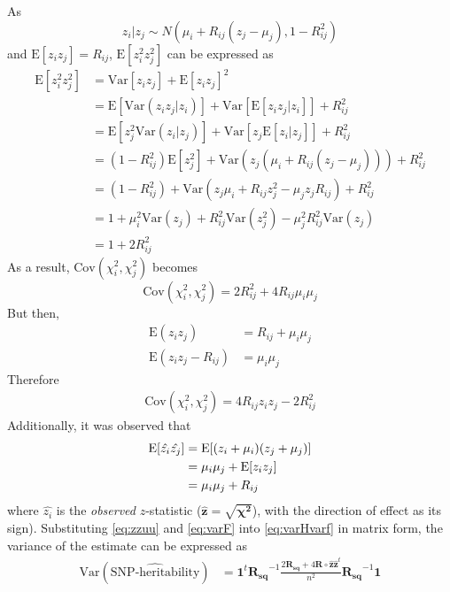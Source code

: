 \documentclass[12pt]{scrbook}
\begin{document}
As 
$$
z_i|z_j\sim N(\mu_i+R_{ij}(z_j-\mu_j),1-R_{ij}^2)
$$
and $\mathrm{E}[z_iz_j]=R_{ij}$, $\mathrm{E}[z_i^2z_j^2]$ can be expressed as
\begin{align*}
\mathrm{E}[z_i^2z_j^2]&=\mathrm{Var}[z_iz_j]+\mathrm{E}[z_iz_j]^2\\
&=\mathrm{E}[\mathrm{Var}(z_iz_j|z_i)]+\mathrm{Var}[\mathrm{E}[z_iz_j|z_i]]+R_{ij}^2\\
&=\mathrm{E}[z_j^2\mathrm{Var}(z_i|z_j)]+\mathrm{Var}[z_j\mathrm{E}[z_i|z_j]]+R_{ij}^2\\
&=(1-R_{ij}^2)\mathrm{E}[z_j^2]+\mathrm{Var}(z_j(\mu_i+R_{ij}(z_j-\mu_j)))+R_{ij}^2\\
&=(1-R_{ij}^2)+\mathrm{Var}(z_j\mu_i+R_{ij}z_j^2-\mu_jz_jR_{ij})+R_{ij}^2\\
&=1+\mu_i^2\mathrm{Var}(z_j)+R_{ij}^2\mathrm{Var}(z_j^2)-\mu_j^2R_{ij}^2\mathrm{Var}(z_j)\\
&=1+2R_{ij}^2
\end{align*}
As a result, $\mathrm{Cov}(\chi_i^2, \chi_j^2)$ becomes
\begin{equation}
\mathrm{Cov}(\chi_i^2,\chi_j^2) = 2R_{ij}^2+4R_{ij}\mu_i\mu_j
\label{eq:finalChi}
\end{equation}
But then, 
\begin{align}
\mathrm{E}(z_iz_j) &= R_{ij}+\mu_i\mu_j \nonumber \\
\mathrm{E}(z_iz_j-R_{ij})&=\mu_i\mu_j
\end{align}
Therefore
\begin{align}
\mathrm{Cov}(\chi_i^2, \chi_j^2)=4R_{ij}z_iz_j-2R_{ij}^2
\label{eq:varF}
\end{align}
Additionally, it was observed that
\begin{align}
\mathrm{E}[\hat{z_i}\hat{z_j}]&=\mathrm{E}[(z_i+\mu_i)(z_j+\mu_j)]\notag\\
&=\mu_i\mu_j+\mathrm{E}[z_iz_j]\nonumber\\
&=\mu_i\mu_j+R_{ij}
\label{eq:zzuu}
\end{align}
where $\hat{z_i}$ is the \emph{observed} $z$-statistic ($\boldsymbol{\hat{z}} = \sqrt{\boldsymbol{\chi^2}}$), with the direction of effect as its sign).
Substituting \cref{eq:zzuu} and \cref{eq:varF} into \cref{eq:varHvarf} in matrix form, the variance of the estimate can be expressed as
\begin{align}
\mathrm{Var}(\hat{\text{SNP-heritability}}) &=\boldsymbol{1}^t\boldsymbol{R_{sq}}^{-1}\frac{2\boldsymbol{R_{sq}}+4\boldsymbol{R}\circ \boldsymbol{\hat{z}\hat{z}}^t}{n^2}\boldsymbol{R_{sq}}^{-1}\boldsymbol{1}
\label{eq:covH}
\end{align}
\end{document}
